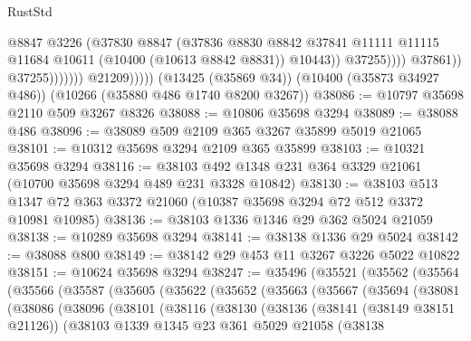 \begin{lexlean}{RustStd}
\begin{coremodule}
                                        @8847
                                        @3226
                                        (@37830
                                          @8847
                                          (@37836
                                            @8830
                                            @8842
                                            @37841
                                            @11111
                                            @11115
                                            @11684
                                            @10611
                                            (@10400 (@10613 @8842 @8831))
                                            @10443))
                                        @37255))))
                                @37861))
                            @37255)))))))
              @21209)))))
    (@13425 (@35869 @34))
    (@10400 (@35873 @34927 @486))
    (@10266 (@35880 @486 @1740 @8200 @3267))
@38086 := @10797 @35698 @2110 @509 @3267 @8326
@38088 := @10806 @35698 @3294
@38089 := @38088 @486
@38096 := @38089 @509 @2109 @365 @3267 @35899 @5019 @21065
@38101 := @10312 @35698 @3294 @2109 @365 @35899
@38103 := @10321 @35698 @3294
@38116 := @38103 @492 @1348 @231 @364 @3329 @21061 (@10700 @35698 @3294 @489 @231 @3328 @10842)
@38130 := @38103 @513 @1347 @72 @363 @3372 @21060 (@10387 @35698 @3294 @72 @512 @3372 @10981 @10985)
@38136 := @38103 @1336 @1346 @29 @362 @5024 @21059
@38138 := @10289 @35698 @3294
@38141 := @38138 @1336 @29 @5024
@38142 := @38088 @800
@38149 := @38142 @29 @453 @11 @3267 @3226 @5022 @10822
@38151 := @10624 @35698 @3294
@38247 := @35496
    (@35521
      (@35562
        (@35564
          (@35566
            (@35587
              (@35605
                (@35622
                  (@35652
                    (@35663
                      (@35667
                        (@35694
                          (@38081
                            (@38086
                              (@38096
                                (@38101
                                  (@38116
                                    (@38130
                                      (@38136
                                        (@38141 (@38149 @38151 @21126))
                                        (@38103
                                          @1339
                                          @1345
                                          @23
                                          @361
                                          @5029
                                          @21058
                                          (@38138

\end{coremodule}
\end{lexlean}
